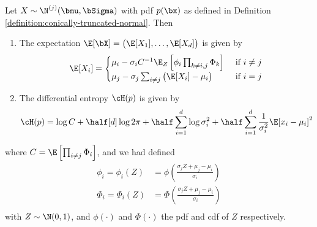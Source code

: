 \begin{lemma}\label{lem:expectation-entropy-truncated-mvn}
  Let $X \sim \N^{(j)}(\bmu, \bSigma)$ with pdf $p(\bx)$ as defined in Definition \ref{definition:conically-truncated-normal}. Then
  \begin{enumerate}[label=(\roman*)]
    \item The expectation $\E[\bX] = \big(\E[X_1], \dots, \E[X_d] \big)$ is given by
    \[
      \E[X_i] =
      \begin{cases}
        \mu_i - \sigma_i C^{-1} \E_Z\left[\phi_i \prod_{k \neq i,j} \Phi_k \right] 
        &\text{ if } i \neq j \\
        \mu_j - \sigma_j \sum_{i \neq j} \big(\E[X_i] - \mu_i \big) &\text{ if } i = j \\
      \end{cases}
    \]
    \item The differential entropy $\cH(p)$ is given by
    \[
    \cH(p) = \log C + \half[d] \log 2\pi + \half \sum_{i=1}^d \log \sigma_i^2 + \half \sum_{i=1}^d \frac{1}{\sigma_i^2} \E [ x_i - \mu_i ]^2
    \]
  \end{enumerate} 
  where $C = \E \left[ \prod_{i \neq j} \Phi_i \right]$, and we had defined
  \begin{align*}
    \phi_i = \phi_i(Z) &= \phi \left( \frac{\sigma_j Z + \mu_j - \mu_i}{\sigma_i} \right) \\
    \Phi_i = \Phi_i(Z) &= \Phi \left( \frac{\sigma_j Z + \mu_j - \mu_i}{\sigma_i} \right) \\    
  \end{align*}
  with $Z \sim \N(0,1)$, and $\phi(\cdot)$ and $\Phi(\cdot)$ the pdf and cdf of $Z$ respectively.
\end{lemma}

